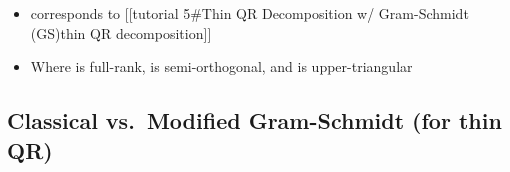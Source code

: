\begin{itemize}
        \begin{itemize}

          \item
                corresponds to {[}{[}tutorial 5\#Thin QR Decomposition w/
                Gram-Schmidt (GS)\textbar thin QR decomposition{]}{]}
          \item
                Where  is full-rank,
                 is
                semi-orthogonal, and  is
                upper-triangular
        \end{itemize}
\end{itemize}

\subsection*{Classical vs.~Modified Gram-Schmidt (for thin
  QR)}


